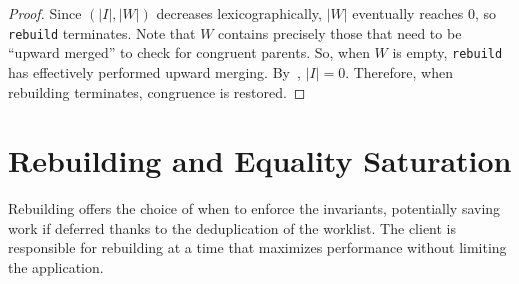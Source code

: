 \begin{proof}
  Since $(|I|, |W|)$ decreases lexicographically,
    $|W|$ eventually reaches $0$, so \texttt{rebuild} terminates.
  Note that $W$ contains precisely those \eclasses that need to be
    ``upward merged'' to check for congruent parents.
  So, when $W$ is empty,
    \texttt{rebuild} has effectively performed upward merging.
  By~\cite[Chapter 7]{nelson}, $|I| = 0$.
Therefore, when rebuilding terminates, congruence is restored.

\end{proof}

\section{Rebuilding and Equality Saturation}
\label{sec:rebuilding-eqsat}

Rebuilding offers the choice of when to enforce the \egraph invariants,
  potentially saving work if deferred thanks to the deduplication of the
  worklist.
The client is responsible for rebuilding at a time that
  maximizes performance without limiting the application.

